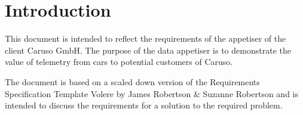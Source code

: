 \chapter{Introduction}
This document is intended to reflect the requirements of the \gls{appetiser} of the client Caruso GmbH. The purpose of the data appetiser is to demonstrate the value of \gls{telemetry} from cars to potential customers of Caruso.

The document is based on a scaled down version of the Requirements Specification Template Volere by James Robertson \& Suzanne Robertson and is intended to discuss the requirements for a solution to the required problem.